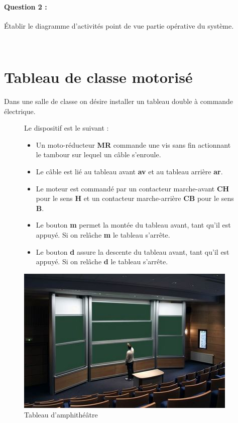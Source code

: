 \paragraph{Question 2 :} Établir le diagramme d'activités point de vue partie opérative du système.

\newpage

~\

\newpage

\section{Tableau de classe motorisé}

Dans une salle de classe on désire installer un tableau double à commande électrique.

\begin{figure}[!h]
\begin{minipage}{0.55\linewidth}
Le dispositif est le suivant :
\begin{itemize}
 \item Un moto-réducteur \textbf{MR} commande une vis sans fin actionnant le tambour sur lequel un câble s'enroule.
 \item Le câble est lié au tableau avant \textbf{av} et au tableau arrière \textbf{ar}.
 \item Le moteur est commandé par un contacteur marche-avant \textbf{CH} pour le sens \textbf{H} et un contacteur marche-arrière \textbf{CB} pour le sens \textbf{B}.
 \item Le bouton \textbf{m} permet la montée du tableau avant, tant qu'il est appuyé. Si on relâche \textbf{m} le tableau s'arrête.
 \item Le bouton \textbf{d} assure la descente du tableau avant, tant qu'il est appuyé. Si on relâche \textbf{d} le tableau s'arrête.
\end{itemize}
\end{minipage}
\hfill
\begin{minipage}{0.4\linewidth}
 \begin{center}
 \includegraphics[width=1\linewidth]{img/Tableau.jpg}
 \end{center}
 \caption{Tableau d'amphithéâtre}
 \label{img5}
 \end{minipage}
\end{figure}

